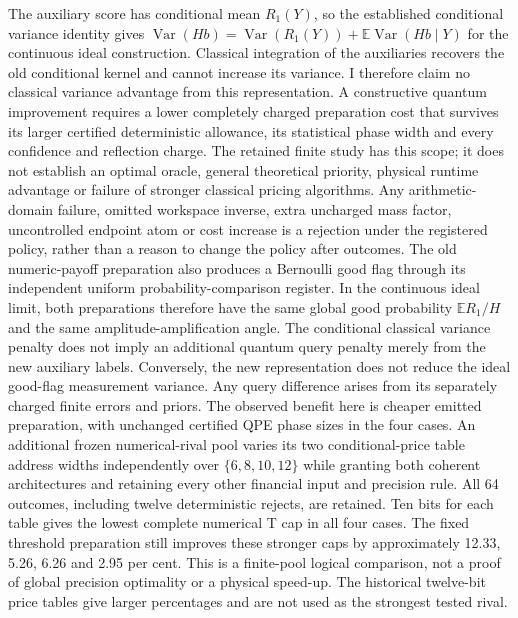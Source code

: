 \documentclass[11pt]{article}
\newcommand{\E}{\mathbb E}
\begin{document}
The auxiliary score has conditional mean $R_1(Y)$, so the established
conditional variance identity gives
$\operatorname{Var}(H b)=\operatorname{Var}(R_1(Y))+
\E\operatorname{Var}(H b\mid Y)$ for the continuous ideal construction.
Classical integration of the auxiliaries recovers the old conditional
kernel and cannot increase its variance. I therefore claim no classical
variance advantage from this representation. A constructive quantum
improvement requires a lower completely charged preparation cost that
survives its larger certified deterministic allowance, its statistical
phase width and every confidence and reflection charge.
The retained finite study has this scope; it does not establish an
optimal oracle, general theoretical priority, physical runtime advantage
or failure of stronger classical pricing algorithms. Any arithmetic-domain
failure, omitted workspace inverse, extra uncharged mass factor,
uncontrolled endpoint atom or cost increase is a rejection under the
registered policy, rather than a reason to change the policy after outcomes.
The old numeric-payoff preparation also produces a Bernoulli good flag
through its independent uniform probability-comparison register. In the
continuous ideal limit, both preparations therefore have the same global
good probability $\E R_1/H$ and the same amplitude-amplification angle.
The conditional classical variance penalty does not imply an additional
quantum query penalty merely from the new auxiliary labels. Conversely,
the new representation does not reduce the ideal good-flag measurement
variance. Any query difference arises from its separately charged finite
errors and priors. The observed benefit here is cheaper emitted
preparation, with unchanged certified QPE phase sizes in the four cases.
An additional frozen numerical-rival pool varies its two conditional-price
table address widths independently over $\{6,8,10,12\}$ while granting
both coherent architectures and retaining every other financial input and
precision rule. All 64 outcomes, including twelve deterministic rejects,
are retained. Ten bits for each table gives the lowest complete numerical
T cap in all four cases. The fixed threshold preparation still improves
these stronger caps by approximately 12.33, 5.26, 6.26 and 2.95 per cent.
This is a finite-pool logical comparison, not a proof of global precision
optimality or a physical speed-up. The historical twelve-bit price tables
give larger percentages and are not used as the strongest tested rival.
\end{document}
